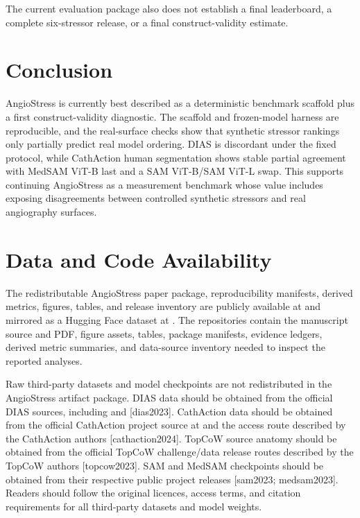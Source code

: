 \documentclass[11pt]{article}
\begin{document}
The current evaluation package also does not establish a final leaderboard, a complete six-stressor release, or a final construct-validity estimate.


\section*{Conclusion}

AngioStress is currently best described as a deterministic benchmark scaffold plus a first construct-validity diagnostic. The scaffold and frozen-model harness are reproducible, and the real-surface checks show that synthetic stressor rankings only partially predict real model ordering. DIAS is discordant under the fixed protocol, while CathAction human segmentation shows stable partial agreement with MedSAM ViT-B last and a SAM ViT-B/SAM ViT-L swap. This supports continuing AngioStress as a measurement benchmark whose value includes exposing disagreements between controlled synthetic stressors and real angiography surfaces.


\section*{Data and Code Availability}

The redistributable AngioStress paper package, reproducibility manifests, derived metrics, figures, tables, and release inventory are publicly available at  and mirrored as a Hugging Face dataset at . The repositories contain the manuscript source and PDF, figure assets, tables, package manifests, evidence ledgers, derived metric summaries, and data-source inventory needed to inspect the reported analyses.


Raw third-party datasets and model checkpoints are not redistributed in the AngioStress artifact package. DIAS data should be obtained from the official DIAS sources, including  and  \textup{[dias2023]}. CathAction data should be obtained from the official CathAction project source at  and the access route described by the CathAction authors \textup{[cathaction2024]}. TopCoW source anatomy should be obtained from the official TopCoW challenge/data release routes described by the TopCoW authors \textup{[topcow2023]}. SAM and MedSAM checkpoints should be obtained from their respective public project releases \textup{[sam2023; medsam2023]}. Readers should follow the original licences, access terms, and citation requirements for all third-party datasets and model weights.
\end{document}
